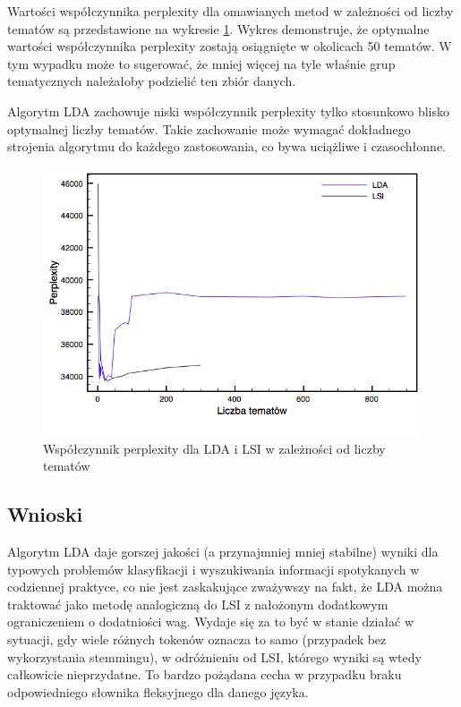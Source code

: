 \documentclass[11pt,a4paper]{article}
\begin{document}
Wartości współczynnika perplexity dla omawianych metod w zależności od liczby
tematów są przedstawione na wykresie \ref{fig:perplexity}. Wykres demonstruje,
że optymalne wartości współczynnika perplexity zostają osiągnięte w okolicach
50 tematów. W tym wypadku może to sugerować, że mniej więcej na tyle właśnie
grup tematycznych należałoby podzielić ten zbiór danych.

Algorytm LDA zachowuje niski współczynnik perplexity tylko stosunkowo blisko
optymalnej liczby tematów. Takie zachowanie może wymagać dokładnego strojenia
algorytmu do każdego zastosowania, co bywa uciążliwe i czasochłonne.

\begin{figure}[h]
\includegraphics[width=\linewidth]{gfx/perplexity.png}
\caption{Współczynnik perplexity dla LDA i LSI w zależności od liczby tematów}
\label{fig:perplexity}
\end{figure}

\FloatBarrier

\subsection{Wnioski}

Algorytm LDA daje gorszej jakości (a przynajmniej mniej stabilne) wyniki dla
typowych problemów klasyfikacji i wyszukiwania informacji spotykanych w
codziennej praktyce, co nie jest zaskakujące zważywszy na fakt, że LDA można
traktować jako metodę analogiczną do LSI z nałożonym dodatkowym ograniczeniem o
dodatniości wag. Wydaje się za to być w stanie działać w sytuacji, gdy wiele
różnych tokenów oznacza to samo (przypadek bez wykorzystania stemmingu), w
odróżnieniu od LSI, którego wyniki są wtedy całkowicie nieprzydatne. To bardzo
pożądana cecha w przypadku braku odpowiedniego słownika fleksyjnego dla danego
języka.
\end{document}
